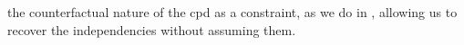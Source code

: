 \documentclass{article}
\theoremstyle{plain}
\theoremstyle{definition}
\theoremstyle{remark}
\numberwithin{equation}{section}
\begin{document}
        the counterfactual nature of the cpd as a constraint, as we
        do in , allowing us to recover the
                independencies without assuming them. 

\end{document}
